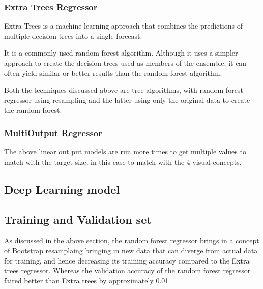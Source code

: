 \documentclass{llncs}
\begin{document}
\subsubsection{Extra Trees Regressor}
Extra Trees is a machine learning approach that combines the predictions of multiple decision trees into a single forecast.

It is a commonly used random forest algorithm. Although it uses a simpler approach to create the decision trees used as members of the ensemble, it can often yield similar or better results than the random forest algorithm.

Both the techniques discussed above are tree algorithms, with random forest regressor using resampling and the latter using only the original data to create the random forest.

\subsubsection{MultiOutput Regressor}
The above linear out put models are run more times to get multiple values to match with the target size, in this case to match with the 4 visual concepts.

\subsection{Deep Learning model}

\subsection{Training and Validation set}
As discussed in the above section, the random forest regressor brings in a concept of Bootstrap resamplaing bringing in new data that can diverge from actual data for training, and hence decreasing its training accuracy compared to the Extra trees regressor.
Whereas the validation accuracy of the random forest regressor faired better than Extra trees by approximately 0.01 %
\end{document}
